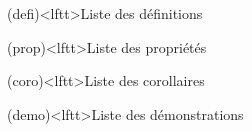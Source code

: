 \documentclass[../../main/main.tex]{subfiles}
\begin{document}


\vspace*{\fill}
\minitoc
\vspace*{\fill}

\newpage

\vspace*{\fill}
\begin{boxes}
  \footnotesize
	\begin{tcb}(defi)<lftt>{Liste des définitions}
	\end{tcb}
	\begin{tcb}(prop)<lftt>{Liste des propriétés}
	\end{tcb}
	\begin{tcb}(coro)<lftt>{Liste des corollaires}
	\end{tcb}
	\begin{tcb}(demo)<lftt>{Liste des démonstrations}

\end{tcb}
\end{boxes}
\end{document}
